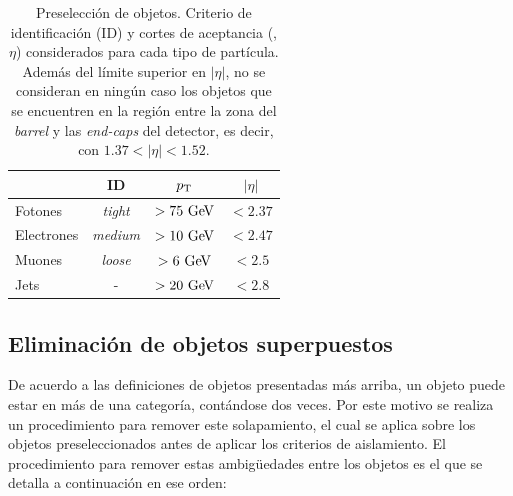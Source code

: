 \begin{table}[!htbp]
  \centering

  \caption{Preselección de objetos. Criterio de identificación (ID) y cortes de
    aceptancia (\pt, $\eta$) considerados para cada tipo de partícula. Además
    del límite superior en $|\eta|$, no se consideran en ningún caso los objetos
    que se encuentren en la región entre la zona del \emph{barrel} y las \emph{end-caps} del detector, es
    decir, con $1.37 < |\eta| < 1.52$.}
  \label{tab:base_sel}

  \begin{tabularx}{0.8\textwidth}{LCCC}
    \hline
    & ID & $p_{\mathrm{T}}$ & $|\eta|$ \\
    \hline
    Fotones    & \emph{tight}  & $> 75 \gev$ & $<2.37$ \\
    Electrones & \emph{medium} & $> 10 \gev$ & $<2.47$ \\
    Muones     & \emph{loose}  & $> 6  \gev$ & $<2.5$  \\
    Jets       & -             & $> 20 \gev$ & $<2.8$  \\
    \hline
  \end{tabularx}

\end{table}





\subsection{Eliminación de objetos superpuestos}
\label{sec:overlap_romoval_event_veto}

De acuerdo a las definiciones de objetos presentadas más arriba, un objeto puede estar en
más de una categoría, contándose dos veces. Por este motivo se realiza un
procedimiento para remover este solapamiento, el cual se aplica sobre los
objetos preseleccionados antes de aplicar los criterios de aislamiento. El
procedimiento para remover estas ambigüedades entre los objetos es el que se
detalla a continuación en ese orden:

